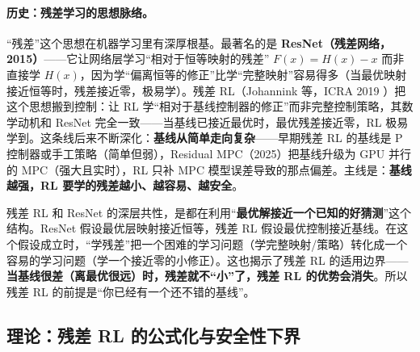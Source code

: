 \paragraph{历史：残差学习的思想脉络。}
“残差”这个思想在机器学习里有深厚根基。最著名的是 \textbf{ResNet（残差网络，2015）}\cite{he2016resnet}——它让网络层学习“相对于恒等映射的残差” $F(x)=H(x)-x$ 而非直接学 $H(x)$，因为学“偏离恒等的修正”比学“完整映射”容易得多（当最优映射接近恒等时，残差接近零，极易学）。残差 RL\cite{johannink2019residual}（Johannink 等，ICRA 2019%
）把这个思想搬到控制：让 RL 学“相对于基线控制器的修正”而非完整控制策略，其数学动机和 ResNet 完全一致——当基线已接近最优时，最优残差接近零，RL 极易学到。这条线后来不断深化：\textbf{基线从简单走向复杂}——早期残差 RL 的基线是 P 控制器或手工策略（简单但弱），Residual MPC\cite{residualmpc2025}（2025）把基线升级为 GPU 并行的 MPC（强大且实时），RL 只补 MPC 模型误差导致的那点偏差。主线是：\textbf{基线越强，RL 要学的残差越小、越容易、越安全}。

\begin{insight}
残差 RL 和 ResNet 的深层共性，是都在利用“\textbf{最优解接近一个已知的好猜测}”这个结构。ResNet 假设最优层映射接近恒等，残差 RL 假设最优控制接近基线。在这个假设成立时，“学残差”把一个困难的学习问题（学完整映射/策略）转化成一个容易的学习问题（学一个接近零的小修正）。这也揭示了残差 RL 的适用边界——\textbf{当基线很差（离最优很远）时，残差就不“小”了，残差 RL 的优势会消失}。所以残差 RL 的前提是“你已经有一个还不错的基线”。
\end{insight}

\subsection{理论：残差 RL 的公式化与安全性下界}
\label{sec:mh-residual-theory}

